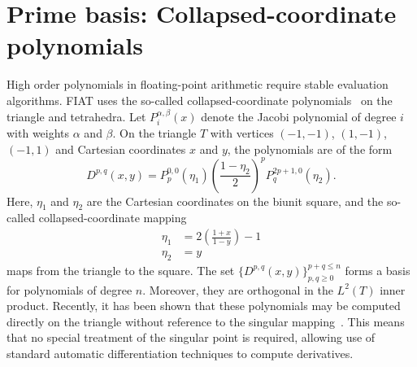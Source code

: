 \section{Prime basis: Collapsed-coordinate polynomials}

High order polynomials in floating-point arithmetic require stable
evaluation algorithms.  FIAT uses the so-called collapsed-coordinate
polynomials~\citep{KarniadakisSherwin2005} on the triangle and tetrahedra.  Let
\(P^{\alpha,\beta}_i(x) \) denote the Jacobi polynomial of degree \( i
\) with weights \( \alpha \) and \( \beta \).  On the triangle \( T \)
with vertices \( (-1,-1) \), \((1,-1) \), \( (-1,1) \) and Cartesian
coordinates \( x\) and \( y \), the polynomials are of the form
\[
  D^{p,q}( x,y ) = P^{0,0}_{p}(\eta_1)  \left( \frac{1-\eta_2}{2}
  \right)^p P^{2p+1,0}_q(\eta_2).
\]
Here, \( \eta_1 \) and \( \eta_2 \) are the Cartesian coordinates on
the biunit square, and the so-called collapsed-coordinate mapping
\[
\begin{split}
\eta_1 & = 2\left( \frac{1+x}{1-y} \right) - 1
\\
\eta_2 & = y
\end{split}
\]
maps from the triangle to the square.  The set \( \{ D^{p,q}( x,y)
\}_{p,q \geqslant 0}^{p+q\leqslant n} \) forms a basis for polynomials of
degree \( n \).  Moreover, they are orthogonal in the \( L^2(T) \)
inner product.  Recently, it has been shown that these polynomials
may be computed directly on the triangle without reference to the
singular mapping~\citep{Kirby2009}.  This means that no special treatment
of the singular point is required, allowing use of standard automatic
differentiation techniques to compute derivatives.

